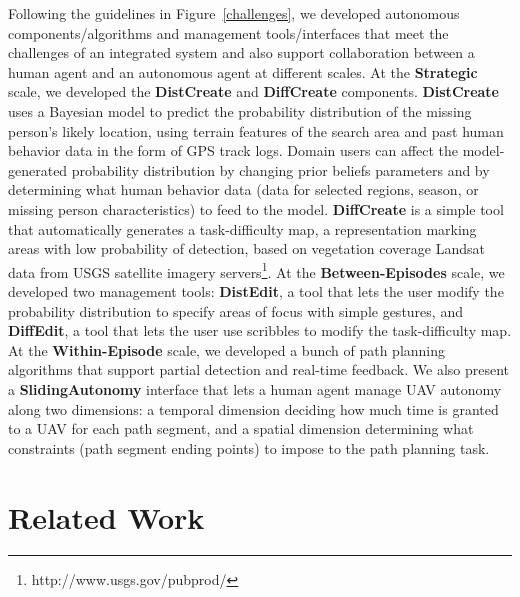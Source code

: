 Following the guidelines in Figure~\ref{challenges}, we developed autonomous components/algorithms and management tools/interfaces that meet the challenges of an integrated system and also support collaboration between a human agent and an autonomous agent at different scales. At  the \textbf{Strategic} scale, we developed the \textbf{DistCreate} and \textbf{DiffCreate} components. \textbf{DistCreate} uses a Bayesian model to predict the probability distribution of the missing person's likely location, using terrain features of the search area and past human behavior data in the form of GPS track logs. Domain users can affect the model-generated probability distribution by changing prior beliefs parameters and by determining what human behavior data (data for selected regions, season, or missing person characteristics) to feed to the model. \textbf{DiffCreate} is a simple tool that automatically generates a task-difficulty map, a representation marking areas with low probability of detection, based on vegetation coverage Landsat data from USGS satellite imagery servers\footnote{http://www.usgs.gov/pubprod/}. At the \textbf{Between-Episodes} scale, we developed two management tools: \textbf{DistEdit}, a tool that lets the user modify the probability distribution to specify areas of focus with simple gestures, and \textbf{DiffEdit}, a tool that lets the user use scribbles to modify the task-difficulty map. At the \textbf{Within-Episode} scale, we developed a bunch of path planning algorithms that support partial detection and real-time feedback. We also present a \textbf{SlidingAutonomy} interface that lets a human agent manage UAV autonomy along two dimensions: a temporal dimension deciding how much time is granted to a UAV for each path segment, and a spatial dimension determining what  constraints (path segment ending points) to impose to the path planning task.


\section{Related Work}
\label{related}

